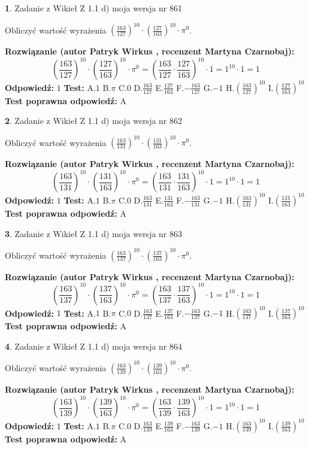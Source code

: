 \documentclass[12pt, a4paper]{article}
\theoremstyle{definition} %
\newtheorem{zad}{}
\newcommand{\zadStart}[1]{\begin{zad}#1\newline}
\newcommand{\zadStop}{\end{zad}}
\newcommand{\rozwStart}[2]{\noindent \textbf{Rozwiązanie (autor #1 , recenzent #2): }\newline}
\newcommand{\rozwStop}{\newline}
\newcommand{\odpStart}{\noindent \textbf{Odpowiedź:}\newline}
\newcommand{\odpStop}{\newline}
\newcommand{\testStart}{\noindent \textbf{Test:}\newline}
\newcommand{\testStop}{\newline}
\newcommand{\kluczStart}{\noindent \textbf{Test poprawna odpowiedź:}\newline}
\newcommand{\kluczStop}{\newline}
\begin{document}
\zadStart{Zadanie z Wikieł Z 1.1 d) moja wersja nr 861}

Obliczyć wartość wyrażenia $(\frac{163}{127})^{10} \cdot (\frac{127}{163})^{10} \cdot \pi^{0}$.
\zadStop
\rozwStart{Patryk Wirkus}{Martyna Czarnobaj}
$$(\frac{163}{127})^{10} \cdot (\frac{127}{163})^{10} \cdot \pi^{0} = (\frac{163}{127} \cdot \frac{127}{163})^{10} \cdot 1 = 1^{10} \cdot 1 = 1$$
\rozwStop
\odpStart
$1$
\odpStop
\testStart
A.$1$ B.$\pi$ C.$0$ D.$\frac{163}{127}$ E.$\frac{127}{163}$
F.$-\frac{163}{127}$ G.$-1$
H.$(\frac{163}{127})^{10}$
I.$(\frac{127}{163})^{10}$
\testStop
\kluczStart
A
\kluczStop



\zadStart{Zadanie z Wikieł Z 1.1 d) moja wersja nr 862}

Obliczyć wartość wyrażenia $(\frac{163}{131})^{10} \cdot (\frac{131}{163})^{10} \cdot \pi^{0}$.
\zadStop
\rozwStart{Patryk Wirkus}{Martyna Czarnobaj}
$$(\frac{163}{131})^{10} \cdot (\frac{131}{163})^{10} \cdot \pi^{0} = (\frac{163}{131} \cdot \frac{131}{163})^{10} \cdot 1 = 1^{10} \cdot 1 = 1$$
\rozwStop
\odpStart
$1$
\odpStop
\testStart
A.$1$ B.$\pi$ C.$0$ D.$\frac{163}{131}$ E.$\frac{131}{163}$
F.$-\frac{163}{131}$ G.$-1$
H.$(\frac{163}{131})^{10}$
I.$(\frac{131}{163})^{10}$
\testStop
\kluczStart
A
\kluczStop



\zadStart{Zadanie z Wikieł Z 1.1 d) moja wersja nr 863}

Obliczyć wartość wyrażenia $(\frac{163}{137})^{10} \cdot (\frac{137}{163})^{10} \cdot \pi^{0}$.
\zadStop
\rozwStart{Patryk Wirkus}{Martyna Czarnobaj}
$$(\frac{163}{137})^{10} \cdot (\frac{137}{163})^{10} \cdot \pi^{0} = (\frac{163}{137} \cdot \frac{137}{163})^{10} \cdot 1 = 1^{10} \cdot 1 = 1$$
\rozwStop
\odpStart
$1$
\odpStop
\testStart
A.$1$ B.$\pi$ C.$0$ D.$\frac{163}{137}$ E.$\frac{137}{163}$
F.$-\frac{163}{137}$ G.$-1$
H.$(\frac{163}{137})^{10}$
I.$(\frac{137}{163})^{10}$
\testStop
\kluczStart
A
\kluczStop



\zadStart{Zadanie z Wikieł Z 1.1 d) moja wersja nr 864}

Obliczyć wartość wyrażenia $(\frac{163}{139})^{10} \cdot (\frac{139}{163})^{10} \cdot \pi^{0}$.
\zadStop
\rozwStart{Patryk Wirkus}{Martyna Czarnobaj}
$$(\frac{163}{139})^{10} \cdot (\frac{139}{163})^{10} \cdot \pi^{0} = (\frac{163}{139} \cdot \frac{139}{163})^{10} \cdot 1 = 1^{10} \cdot 1 = 1$$
\rozwStop
\odpStart
$1$
\odpStop
\testStart
A.$1$ B.$\pi$ C.$0$ D.$\frac{163}{139}$ E.$\frac{139}{163}$
F.$-\frac{163}{139}$ G.$-1$
H.$(\frac{163}{139})^{10}$
I.$(\frac{139}{163})^{10}$
\testStop
\kluczStart
A
\kluczStop
\end{document}
